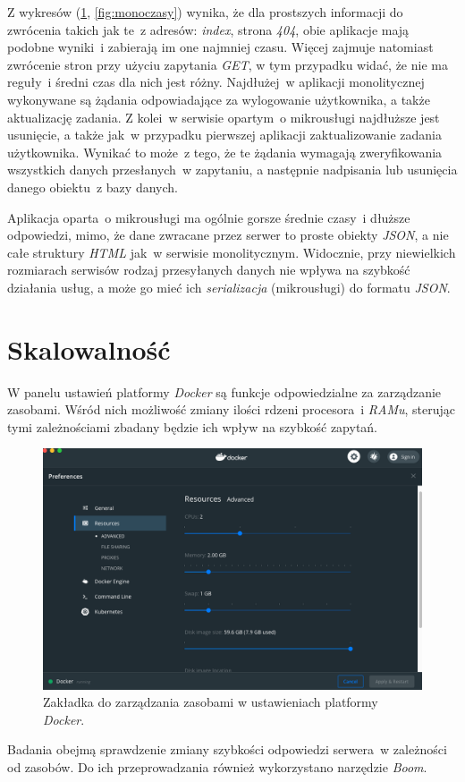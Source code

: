 Z wykresów (\ref{fig:microczasy}, \ref{fig:monoczasy}) wynika, że dla prostszych informacji do zwrócenia takich jak te~z adresów: \textit{index}, strona \textit{404}, obie aplikacje mają podobne wyniki~i zabierają im one najmniej czasu. Więcej zajmuje natomiast zwrócenie stron przy użyciu zapytania \textit{GET}, w tym przypadku widać, że nie ma reguły~i średni czas dla nich jest różny. Najdłużej~w aplikacji monolitycznej wykonywane są żądania odpowiadające za wylogowanie użytkownika, a także aktualizację zadania. Z kolei~w serwisie opartym~o mikrousługi najdłuższe jest usunięcie, a także jak~w przypadku pierwszej aplikacji zaktualizowanie zadania użytkownika.  Wynikać to może~z tego, że te żądania wymagają zweryfikowania wszystkich danych przesłanych~w zapytaniu, a następnie nadpisania lub usunięcia danego obiektu~z bazy danych.

Aplikacja oparta~o mikrousługi ma ogólnie gorsze średnie czasy~i dłuższe odpowiedzi, mimo, że dane zwracane przez serwer to proste obiekty \textit{JSON}, a nie całe struktury \textit{HTML} jak~w serwisie monolitycznym. Widocznie, przy niewielkich rozmiarach serwisów rodzaj przesyłanych danych nie wpływa na szybkość działania usług, a może go mieć ich \textit{serializacja} (mikrousługi) do formatu \textit{JSON}.

\section{Skalowalność}
W panelu ustawień platformy \textit{Docker} są funkcje odpowiedzialne za zarządzanie zasobami. Wśród nich możliwość zmiany ilości rdzeni procesora~i \textit{RAMu}, sterując tymi zależnościami zbadany będzie ich wpływ na szybkość zapytań.

\begin{figure}[h!]
	\centering
		\includegraphics[width=12cm]{Rysunki/Rozdzial7/dockerpanel.png}
		\caption{Zakładka do zarządzania zasobami w ustawieniach platformy \textit{Docker}.}
		\label{fig:microczasy}
	\end{figure}
Badania obejmą sprawdzenie zmiany szybkości odpowiedzi serwera~w zależności od zasobów. Do ich przeprowadzania również wykorzystano narzędzie \textit{Boom}.

